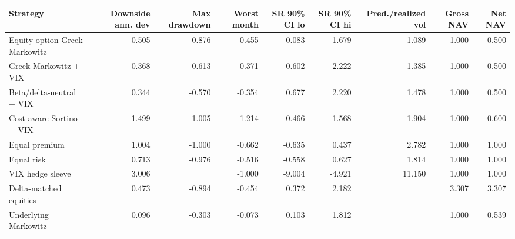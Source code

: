 \begin{tabular}{lrrrrrrrr}
\toprule
Strategy & Downside ann. dev & Max drawdown & Worst month & SR 90\% CI lo & SR 90\% CI hi & Pred./realized vol & Gross NAV & Net NAV \\
\midrule
Equity-option Greek Markowitz & 0.505 & -0.876 & -0.455 & 0.083 & 1.679 & 1.089 & 1.000 & 0.500 \\
Greek Markowitz + VIX & 0.368 & -0.613 & -0.371 & 0.602 & 2.222 & 1.385 & 1.000 & 0.500 \\
Beta/delta-neutral + VIX & 0.344 & -0.570 & -0.354 & 0.677 & 2.220 & 1.478 & 1.000 & 0.500 \\
Cost-aware Sortino + VIX & 1.499 & -1.005 & -1.214 & 0.466 & 1.568 & 1.904 & 1.000 & 0.600 \\
Equal premium & 1.004 & -1.000 & -0.662 & -0.635 & 0.437 & 2.782 & 1.000 & 1.000 \\
Equal risk & 0.713 & -0.976 & -0.516 & -0.558 & 0.627 & 1.814 & 1.000 & 1.000 \\
VIX hedge sleeve & 3.006 &  & -1.000 & -9.004 & -4.921 & 11.150 & 1.000 & 1.000 \\
Delta-matched equities & 0.473 & -0.894 & -0.454 & 0.372 & 2.182 &  & 3.307 & 3.307 \\
Underlying Markowitz & 0.096 & -0.303 & -0.073 & 0.103 & 1.812 &  & 1.000 & 0.539 \\
\bottomrule
\end{tabular}
